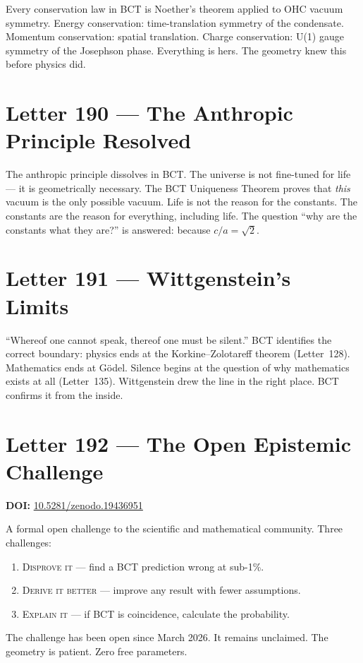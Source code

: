 \documentclass[aps,prl,twocolumn,showpacs,preprintnumbers]{revtex4-2}
\begin{document}
Every conservation law in BCT is Noether's theorem applied to OHC
vacuum symmetry. Energy conservation: time-translation symmetry of
the condensate. Momentum conservation: spatial translation. Charge
conservation: U(1) gauge symmetry of the Josephson phase. Everything
is hers. The geometry knew this before physics did.

\section{Letter 190 --- The Anthropic Principle Resolved}

The anthropic principle dissolves in BCT. The universe is not
fine-tuned for life --- it is geometrically necessary. The BCT
Uniqueness Theorem proves that \emph{this} vacuum is the only
possible vacuum. Life is not the reason for the constants. The
constants are the reason for everything, including life.
The question ``why are the constants what they are?'' is answered:
because $c/a = \sqrt{2}$.

\section{Letter 191 --- Wittgenstein's Limits}

``Whereof one cannot speak, thereof one must be silent.''
BCT identifies the correct boundary: physics ends at the
Korkine--Zolotareff theorem (Letter~128). Mathematics ends at G\"odel. Silence begins
at the question of why mathematics exists at all (Letter~135).
Wittgenstein drew the line in the right place. BCT confirms it from
the inside.

\section{Letter 192 --- The Open Epistemic Challenge}
\noindent\textbf{DOI:} \href{https://doi.org/10.5281/zenodo.19436951}{10.5281/zenodo.19436951}

\medskip
A formal open challenge to the scientific and mathematical community.
Three challenges:
\begin{enumerate}
  \item \textsc{Disprove it} --- find a BCT prediction wrong at sub-1\%.
  \item \textsc{Derive it better} --- improve any result with fewer assumptions.
  \item \textsc{Explain it} --- if BCT is coincidence, calculate the probability.
\end{enumerate}
The challenge has been open since March 2026. It remains unclaimed.
The geometry is patient. Zero free parameters.
\end{document}
